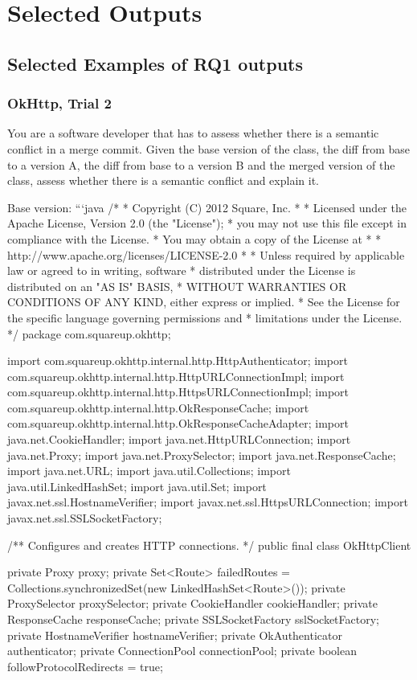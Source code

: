 \chapter{Selected Outputs} \label{ap2:sele}
\section{Selected Examples of RQ1 outputs}

\subsection{OkHttp, Trial 2}

\begin{prompt}
  You are a software developer that has to assess whether there is a semantic conflict in a merge commit.  Given the base version of the class, the diff from base to a version A, the diff from base to a version B and the merged version of the class, assess whether there is a semantic conflict and explain it.

Base version:
```java
/*
 * Copyright (C) 2012 Square, Inc.
 *
 * Licensed under the Apache License, Version 2.0 (the "License");
 * you may not use this file except in compliance with the License.
 * You may obtain a copy of the License at
 *
 *      http://www.apache.org/licenses/LICENSE-2.0
 *
 * Unless required by applicable law or agreed to in writing, software
 * distributed under the License is distributed on an "AS IS" BASIS,
 * WITHOUT WARRANTIES OR CONDITIONS OF ANY KIND, either express or implied.
 * See the License for the specific language governing permissions and
 * limitations under the License.
 */
package com.squareup.okhttp;

import com.squareup.okhttp.internal.http.HttpAuthenticator;
import com.squareup.okhttp.internal.http.HttpURLConnectionImpl;
import com.squareup.okhttp.internal.http.HttpsURLConnectionImpl;
import com.squareup.okhttp.internal.http.OkResponseCache;
import com.squareup.okhttp.internal.http.OkResponseCacheAdapter;
import java.net.CookieHandler;
import java.net.HttpURLConnection;
import java.net.Proxy;
import java.net.ProxySelector;
import java.net.ResponseCache;
import java.net.URL;
import java.util.Collections;
import java.util.LinkedHashSet;
import java.util.Set;
import javax.net.ssl.HostnameVerifier;
import javax.net.ssl.HttpsURLConnection;
import javax.net.ssl.SSLSocketFactory;

/** Configures and creates HTTP connections. */
public final class OkHttpClient {
  private Proxy proxy;
  private Set<Route> failedRoutes = Collections.synchronizedSet(new LinkedHashSet<Route>());
  private ProxySelector proxySelector;
  private CookieHandler cookieHandler;
  private ResponseCache responseCache;
  private SSLSocketFactory sslSocketFactory;
  private HostnameVerifier hostnameVerifier;
  private OkAuthenticator authenticator;
  private ConnectionPool connectionPool;
  private boolean followProtocolRedirects = true;

}
\end{prompt}
